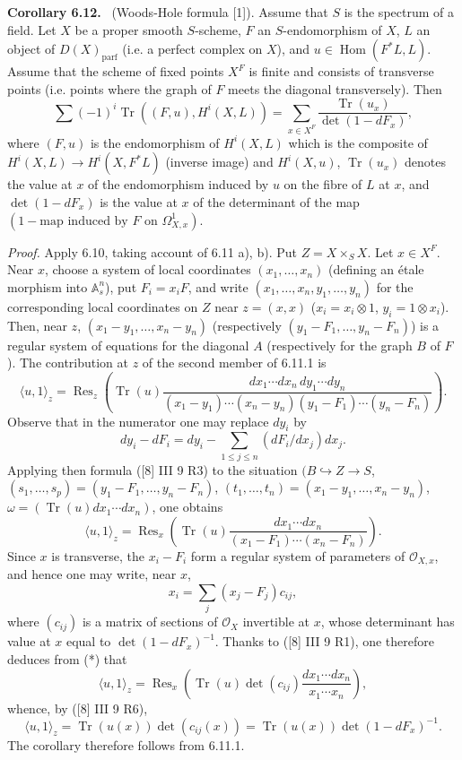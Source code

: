 \documentclass[11pt]{article}
\newenvironment{statement}[1]{\par\medskip\noindent\textbf{#1.}\ }{\par\medskip}
\DeclareMathOperator{\Hom}{Hom}
\providecommand{\OO}{\mathcal{O}}
\providecommand{\parf}{\mathrm{parf}}
\providecommand{\Hom}{\operatorname{Hom}}
\providecommand{\parf}{\mathrm{parf}}
\providecommand{\Hom}{\operatorname{Hom}}
\begin{document}
\begin{statement}{Corollary 6.12}
(Woods-Hole formula [1]). Assume that $S$ is the spectrum of a field. Let $X$ be a proper smooth $S$-scheme, $F$ an $S$-endomorphism of $X$, $L$ an object of $D(X)_{\parf}$ (i.e. a perfect complex on $X$), and $u\in\Hom(F^*L,L)$. Assume that the scheme of fixed points $X^F$ is finite and consists of transverse points (i.e. points where the graph of $F$ meets the diagonal transversely). Then
\[
\sum(-1)^i\operatorname{Tr}((F,u),H^i(X,L))=
\sum_{x\in X^F}\frac{\operatorname{Tr}(u_x)}{\det(1-dF_x)},
\]
where $(F,u)$ is the endomorphism of $H^i(X,L)$ which is the composite of $H^i(X,L)\to H^i(X,F^*L)$ (inverse image) and $H^i(X,u)$, $\operatorname{Tr}(u_x)$ denotes the value at $x$ of the endomorphism induced by $u$ on the fibre of $L$ at $x$, and $\det(1-dF_x)$ is the value at $x$ of the determinant of the map $(1-\text{map induced by }F\text{ on }\Omega^1_{X,x})$.

\emph{Proof.} Apply 6.10, taking account of 6.11 a), b). Put $Z=X\times_S X$. Let $x\in X^F$. Near $x$, choose a system of local coordinates $(x_1,\ldots,x_n)$ (defining an étale morphism into $\mathbb A_s^n$), put $F_i=x_iF$, and write $(x_1,\ldots,x_n,y_1,\ldots,y_n)$ for the corresponding local coordinates on $Z$ near $z=(x,x)$ ($x_i=x_i\otimes1$, $y_i=1\otimes x_i$). Then, near $z$, $(x_1-y_1,\ldots,x_n-y_n)$ (respectively $(y_1-F_1,\ldots,y_n-F_n)$) is a regular system of equations for the diagonal $A$ (respectively for the graph $B$ of $F$). The contribution at $z$ of the second member of 6.11.1 is
\[
\langle u,1\rangle_z=
\operatorname{Res}_z\left(\operatorname{Tr}(u)\frac{dx_1\cdots dx_n\,dy_1\cdots dy_n}{(x_1-y_1)\cdots(x_n-y_n)(y_1-F_1)\cdots(y_n-F_n)}\right).
\]
Observe that in the numerator one may replace $dy_i$ by
\[
dy_i-dF_i=dy_i-\sum_{1\le j\le n}(dF_i/dx_j)dx_j.
\]
Applying then formula ([8] III 9 R3) to the situation $(B\hookrightarrow Z\to S$, $(s_1,\ldots,s_p)=(y_1-F_1,\ldots,y_n-F_n)$, $(t_1,\ldots,t_n)=(x_1-y_1,\ldots,x_n-y_n)$, $\omega=(\operatorname{Tr}(u)dx_1\cdots dx_n)$, one obtains
\begin{equation}
\tag{*}
\langle u,1\rangle_z=
\operatorname{Res}_x\left(\operatorname{Tr}(u)\frac{dx_1\cdots dx_n}{(x_1-F_1)\cdots(x_n-F_n)}\right).
\end{equation}
Since $x$ is transverse, the $x_i-F_i$ form a regular system of parameters of $\OO_{X,x}$, and hence one may write, near $x$,
\[
x_i=\sum_j(x_j-F_j)c_{ij},
\]
where $(c_{ij})$ is a matrix of sections of $\OO_X$ invertible at $x$, whose determinant has value at $x$ equal to $\det(1-dF_x)^{-1}$. Thanks to ([8] III 9 R1), one therefore deduces from (*) that
\[
\langle u,1\rangle_z=\operatorname{Res}_x\left(\operatorname{Tr}(u)\det(c_{ij})\frac{dx_1\cdots dx_n}{x_1\cdots x_n}\right),
\]
whence, by ([8] III 9 R6),
\[
\langle u,1\rangle_z=\operatorname{Tr}(u(x))\det(c_{ij}(x))=\operatorname{Tr}(u(x))\det(1-dF_x)^{-1}.
\]
The corollary therefore follows from 6.11.1.
\end{statement}
\end{document}
